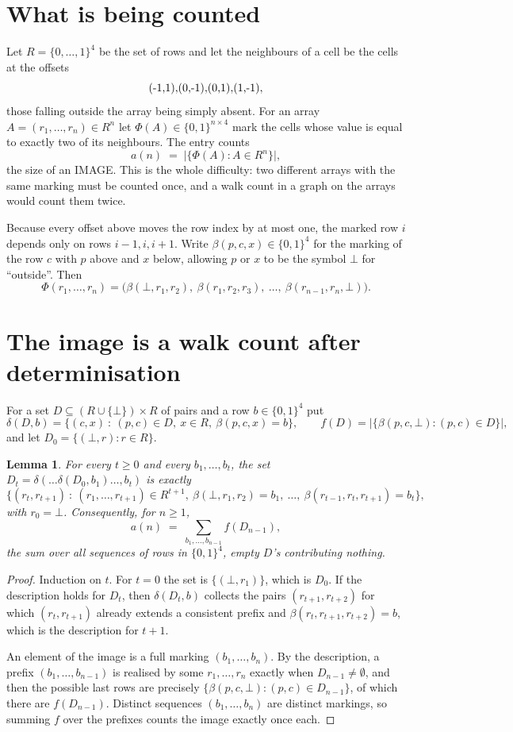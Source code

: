 \documentclass[11pt,a4paper]{article}
\theoremstyle{plain}
\newtheorem{lemma}[theorem]{Lemma}
\theoremstyle{definition}
\begin{document}
\section{What is being counted}

Let $R=\{0,\dots,1\}^{4}$ be the set of rows and let the neighbours of a cell be the
cells at the offsets
\[
$(-1,1)$, $(0,-1)$, $(0,1)$, $(1,-1)$,
\]
those falling outside the array being simply absent. For an array
$A=(r_1,\dots,r_n)\in R^n$ let $\Phi(A)\in\{0,1\}^{n\times4}$ mark the cells whose value
is equal to exactly two of its neighbours. The entry counts
\[
a(n)\;=\;\bigl|\{\Phi(A):A\in R^n\}\bigr| ,
\]
the size of an IMAGE. This is the whole difficulty: two different arrays with the same marking
must be counted once, and a walk count in a graph on the arrays would count them twice.

Because every offset above moves the row index by at most one, the marked row $i$ depends only
on rows $i-1,i,i+1$. Write $\beta(p,c,x)\in\{0,1\}^{4}$ for the marking of the row $c$
with $p$ above and $x$ below, allowing $p$ or $x$ to be the symbol $\bot$ for ``outside''.
Then
\[
\Phi(r_1,\dots,r_n)=\bigl(\beta(\bot,r_1,r_2),\ \beta(r_1,r_2,r_3),\ \dots,\
\beta(r_{n-1},r_n,\bot)\bigr).
\]

\section{The image is a walk count after determinisation}

For a set $D\subseteq(R\cup\{\bot\})\times R$ of pairs and a row $b\in\{0,1\}^{4}$ put
\[
\delta(D,b)=\{(c,x)\ :\ (p,c)\in D,\ x\in R,\ \beta(p,c,x)=b\},\qquad
f(D)=\bigl|\{\beta(p,c,\bot):(p,c)\in D\}\bigr| ,
\]
and let $D_0=\{(\bot,r):r\in R\}$.

\begin{lemma}\label{lem:det}
For every $t\ge0$ and every $b_1,\dots,b_t$, the set
$D_t=\delta(\dots\delta(D_0,b_1)\dots,b_t)$ is exactly
\[
\{(r_t,r_{t+1})\ :\ (r_1,\dots,r_{t+1})\in R^{t+1},\ \beta(\bot,r_1,r_2)=b_1,\ \dots,\
\beta(r_{t-1},r_t,r_{t+1})=b_t\} ,
\]
with $r_0=\bot$. Consequently, for $n\ge1$,
\[
a(n)\;=\;\sum_{b_1,\dots,b_{n-1}}f(D_{n-1}),
\]
the sum over all sequences of rows in $\{0,1\}^{4}$, empty $D$'s contributing nothing.
\end{lemma}

\begin{proof}
Induction on $t$. For $t=0$ the set is $\{(\bot,r_1)\}$, which is $D_0$. If the description
holds for $D_t$, then $\delta(D_t,b)$ collects the pairs $(r_{t+1},r_{t+2})$ for which
$(r_t,r_{t+1})$ already extends a consistent prefix and
$\beta(r_t,r_{t+1},r_{t+2})=b$, which is the description for $t+1$.

An element of the image is a full marking $(b_1,\dots,b_n)$. By the description, a prefix
$(b_1,\dots,b_{n-1})$ is realised by some $r_1,\dots,r_n$ exactly when $D_{n-1}\neq
\emptyset$, and then the possible last rows are precisely
$\{\beta(p,c,\bot):(p,c)\in D_{n-1}\}$, of which there are $f(D_{n-1})$. Distinct
sequences $(b_1,\dots,b_n)$ are distinct markings, so summing $f$ over the prefixes counts the
image exactly once each.
\end{proof}
\end{document}
